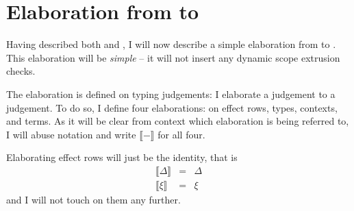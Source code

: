 \section{Elaboration from \texorpdfstring{\sourceLang{}}{Lambda-Op-Quote-Splice} to \texorpdfstring{\coreLang{}}{Lambda-Op-AST}}\label{section:elaboration}
Having described both \sourceLang{} and \coreLang{}, I will now describe a simple elaboration from \sourceLang{} to \coreLang{}. This elaboration will be \textit{simple} -- it will not insert any dynamic scope extrusion checks.

\newcommand{\elaborate}[1]{\llbracket #1 \rrbracket}
\newcommand{\erase}[1]{\textsf{erase}(#1)}
\newcommand{\AST}[1]{\textsf{AST}(#1)}
\newcommand{\Code}[1]{\textsf{Code}(#1)}


The elaboration is defined on typing judgements: I elaborate a \sourceLang{} judgement to a \coreLang{} judgement. To do so, I define four elaborations: on effect rows, types, contexts, and terms. As it will be clear from context which elaboration is being referred to, I will abuse notation and write $\llbracket - \rrbracket$ for all four.

Elaborating effect rows will just be the identity, that is 
\[\begin{array}{rcl}
  \elaborate{\Delta} &=& \Delta \\
  \elaborate{\xi}&=&{\xi}
\end{array}\]
and I will not touch on them any further. 

